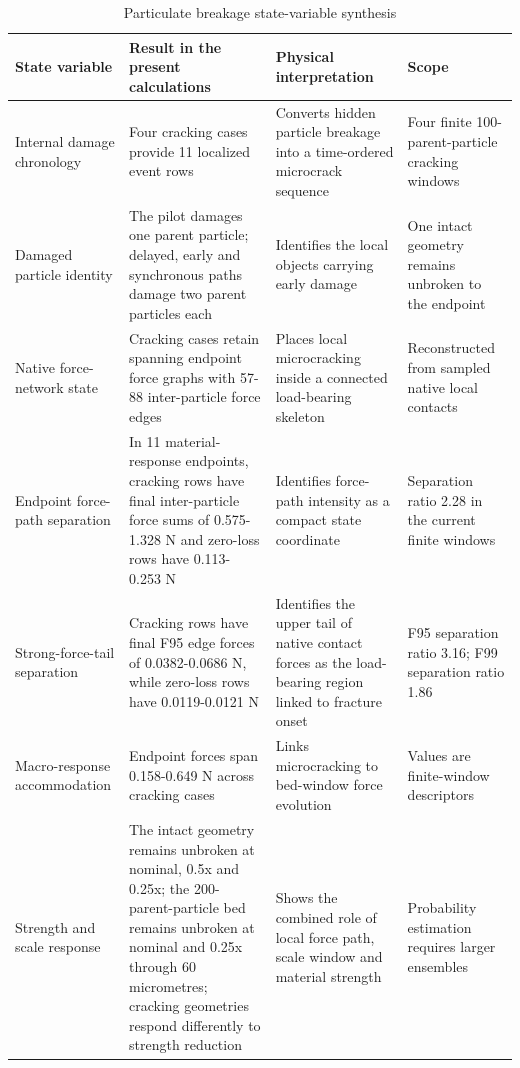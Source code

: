 \documentclass[preprint,12pt]{elsarticle}
\begin{document}
\begin{table}[!t]
\centering
\caption{Particulate breakage state-variable synthesis}
\label{tab:state-variables}
\scriptsize
\setlength{\tabcolsep}{2.2pt}
\renewcommand{\arraystretch}{1.12}
\begin{tabularx}{0.98\textwidth}{>{\raggedright\arraybackslash}p{}>{\raggedright\arraybackslash}p{}>{\raggedright\arraybackslash}p{}>{\raggedright\arraybackslash}X}
\toprule
State variable & Result in the present calculations & Physical interpretation & Scope \\
\midrule
Internal damage chronology & Four cracking cases provide 11 localized event rows & Converts hidden particle breakage into a time-ordered microcrack sequence & Four finite 100-parent-particle cracking windows \\
Damaged particle identity & The pilot damages one parent particle; delayed, early and synchronous paths damage two parent particles each & Identifies the local objects carrying early damage & One intact geometry remains unbroken to the endpoint \\
Native force-network state & Cracking cases retain spanning endpoint force graphs with 57-88 inter-particle force edges & Places local microcracking inside a connected load-bearing skeleton & Reconstructed from sampled native local contacts \\
Endpoint force-path separation & In 11 material-response endpoints, cracking rows have final inter-particle force sums of 0.575-1.328 N and zero-loss rows have 0.113-0.253 N & Identifies force-path intensity as a compact state coordinate & Separation ratio 2.28 in the current finite windows \\
Strong-force-tail separation & Cracking rows have final F95 edge forces of 0.0382-0.0686 N, while zero-loss rows have 0.0119-0.0121 N & Identifies the upper tail of native contact forces as the load-bearing region linked to fracture onset & F95 separation ratio 3.16; F99 separation ratio 1.86 \\
Macro-response accommodation & Endpoint forces span 0.158-0.649 N across cracking cases & Links microcracking to bed-window force evolution & Values are finite-window descriptors \\
Strength and scale response & The intact geometry remains unbroken at nominal, 0.5x and 0.25x; the 200-parent-particle bed remains unbroken at nominal and 0.25x through 60 micrometres; cracking geometries respond differently to strength reduction & Shows the combined role of local force path, scale window and material strength & Probability estimation requires larger ensembles \\
\bottomrule
\end{tabularx}
\end{table}
\end{document}
